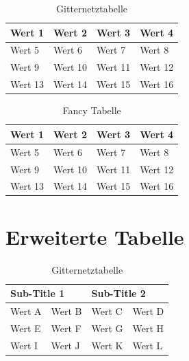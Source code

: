 \documentclass{scrreprt}
\begin{document}
\begin{table}[htbp]
	\caption{Gitternetztabelle}
	\label{tab:gitternetztabelle}
	\label { Tabelle 1.0}
	\centering
	\begin{tabular}{|l|l|l|l|}
		\hline
		Wert 1 & Wert 2 & Wert 3 & Wert 4 \\ \hline
		Wert 5 & Wert 6 & Wert 7 & Wert 8 \\ \hline
		Wert 9 & Wert 10 & Wert 11 & Wert 12  \\ \hline
		Wert 13 & Wert 14 & Wert 15 & Wert 16  \\ \hline
	\end{tabular}
	
\end{table}

\begin{table}[h!]
	\centering
	\caption{Fancy Tabelle}
	\label{tab:fancytabelle}

	\begin{tabular}{llll}
		Wert 1  & Wert 2   & Wert 3  & Wert 4  \\ \hline
		Wert 5  &  Wert 6  & Wert 7  & Wert 8  \\ \hline
		Wert 9  &  Wert 10 & Wert 11 & Wert 12 \\ \hline
		Wert 13 & Wert 14  & Wert 15  & Wert 16 \\ \hline
	\end{tabular}
\end{table}



\section{Erweiterte Tabelle}
\label{se:erwtabelle}

\begin{table}[htbp]
	\caption{Gitternetztabelle}
	\label{tab:multigitternetz}
	\label { Tabelle 1.0}
	\centering
	\begin{tabular}{|l|l|l|l|}
		\hline
		\multicolumn{2}{|l|}{Sub-Title 1} & \multicolumn{2}{l|}{Sub-Title 2} \\ \hline
		Wert A          & Wert B          & Wert C          & Wert D         \\ \hline
		Wert E          & Wert F          & Wert G          & Wert H         \\ \hline
		Wert I          & Wert J          & Wert K          & Wert L         \\ \hline
	\end{tabular}
\end{table}
\end{document}
